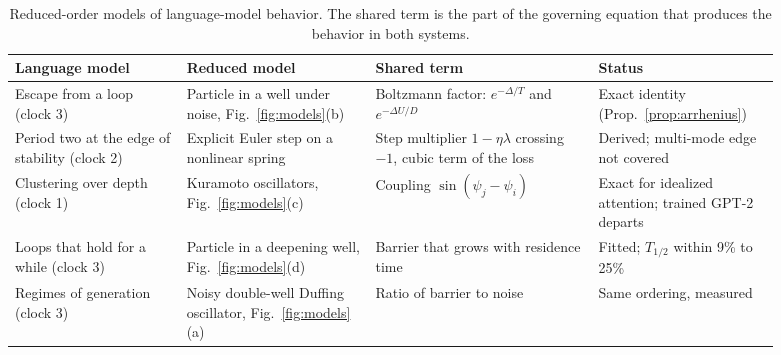\begin{table}[t]
\centering
\small
\caption{Reduced-order models of language-model behavior. The shared term is the part of the governing equation that produces the behavior in both systems.}
\label{tab:reduced}
\begin{tabular}{p{0.2\linewidth}p{0.22\linewidth}p{0.26\linewidth}p{0.21\linewidth}}
\toprule
Language model & Reduced model & Shared term & Status \\
\midrule
Escape from a loop (clock 3) & Particle in a well under noise, Fig.~\ref{fig:models}(b) & Boltzmann factor: $e^{-\Delta/T}$ and $e^{-\Delta U/D}$ & Exact identity (Prop.~\ref{prop:arrhenius}) \\
Period two at the edge of stability (clock 2) & Explicit Euler step on a nonlinear spring & Step multiplier $1-\eta\lambda$ crossing $-1$, cubic term of the loss & Derived; multi-mode edge not covered \\
Clustering over depth (clock 1) & Kuramoto oscillators, Fig.~\ref{fig:models}(c) & Coupling $\sin(\psi_j-\psi_i)$ & Exact for idealized attention; trained GPT-2 departs \\
Loops that hold for a while (clock 3) & Particle in a deepening well, Fig.~\ref{fig:models}(d) & Barrier that grows with residence time & Fitted; $T_{1/2}$ within 9\% to 25\% \\
Regimes of generation (clock 3) & Noisy double-well Duffing oscillator, Fig.~\ref{fig:models}(a) & Ratio of barrier to noise & Same ordering, measured \\
\bottomrule
\end{tabular}
\end{table}

